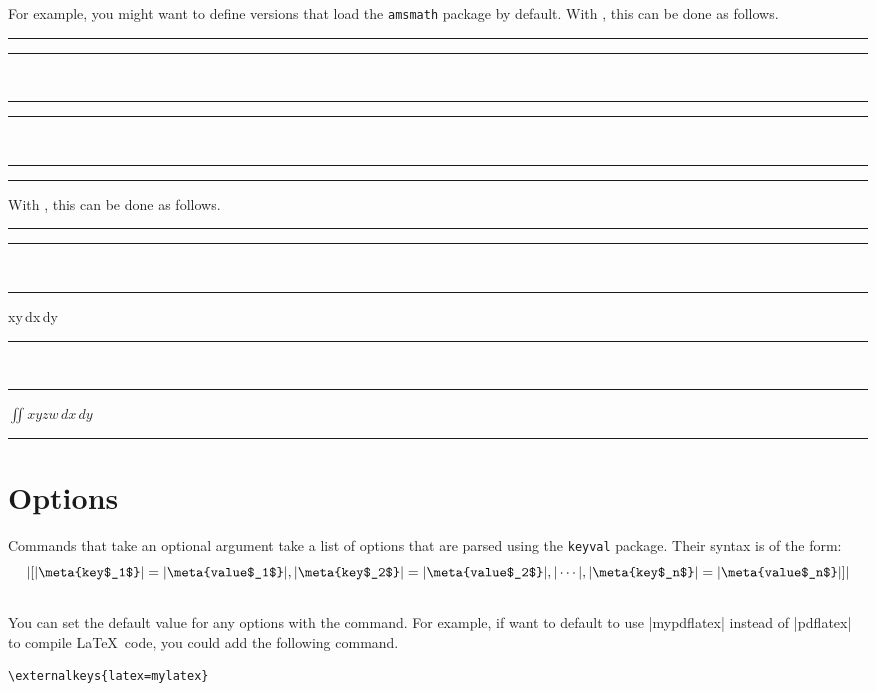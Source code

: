 \documentclass[10pt]{ltxdoc}
\newcommand{\pkg}[1]{\texttt{#1}}
\def\sz{%
  \rule{0.2em}{7pt}%
  \llap{\rule[8pt]{0.2em}{2pt}}%
}
\begin{document}
For example, you might want to define versions that load the
\pkg{amsmath} package by default.
With , this can be done as follows.

\begin{tcblisting}{}
\sz\newexternal[preamble={\usepackage{amsmath}},math=inline]{\ams}\sz~%
\sz{}\sz~%
\sz{}\sz
\end{tcblisting}

With , this can be done as follows.

\begin{tcblisting}{}
\sz
{}%
\sz~%
\sz\begin{amsenv}\iint xy\,dx\,dy\end{amsenv}\sz~%
\sz\begin{amsenv}[math=false]$\iint xyzw\,dx\,dy$\end{amsenv}\sz
\end{tcblisting}

\section{Options}
\label{sec:Options}

Commands that take an optional argument take a list of options that are
parsed using the \pkg{keyval} package.
Their syntax is of the form:
$$
|[|\meta{key$_1$}|=|\meta{value$_1$}|, |\meta{key$_2$}|=|\meta{value$_2$}|, |\cdots|, |\meta{key$_n$}|=|\meta{value$_n$}|]|
$$

\subsection{}
\label{subsec:externalkeys}


You can set the default value for any options with the
 command.
For example, if want to default to use |mypdflatex| instead of
|pdflatex| to compile \LaTeX\ code, you could add the following
command.

\begin{tcolorbox}
\begin{verbatim}
\externalkeys{latex=mylatex}
\end{verbatim}
\end{tcolorbox}
\end{document}
